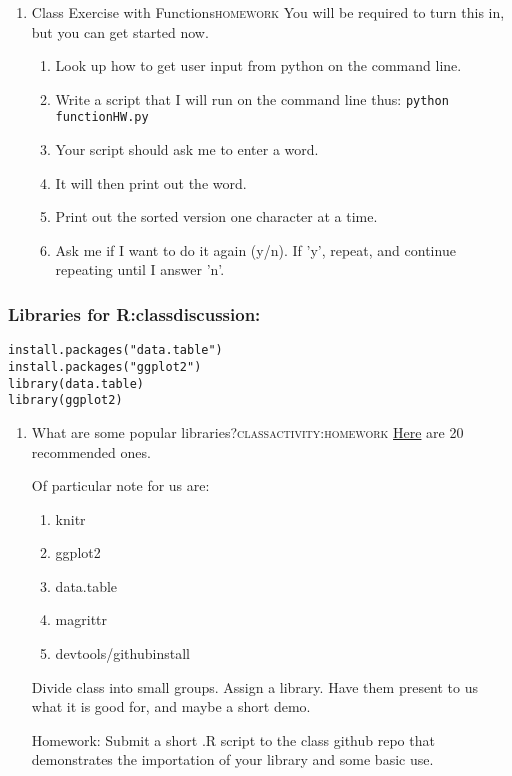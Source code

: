 \documentclass{article}
\begin{document}
\begin{enumerate}
\item Class Exercise with Functions\hfill{}\textsc{homework}
\label{sec:org81251bb}
You will be required to turn this in, but you can get started now. 
\begin{enumerate}
\item Look up how to get user input from python on the command line.
\item Write a script that I will run on the command line thus:
\texttt{python functionHW.py}
\item Your script should ask me to enter a word.
\item It will then print out the word.
\item Print out the sorted version one character at a time.
\item Ask me if I want to do it again (y/n). If 'y', repeat, and continue repeating until I answer 'n'.
\end{enumerate}
\end{enumerate}
\subsubsection{Libraries for R:classdiscussion:}
\label{sec:orga527ced}
\begin{verbatim}
install.packages("data.table")
install.packages("ggplot2")
library(data.table)
library(ggplot2)
\end{verbatim}
\begin{enumerate}
\item What are some popular libraries?\hfill{}\textsc{classactivity:homework}
\label{sec:org9ea0cbb}
\href{https://pythontips.com/2013/07/30/20-python-libraries-you-cant-live-without/}{Here} are 20 recommended ones.

Of particular note for us are:
\begin{enumerate}
\item knitr
\item ggplot2
\item data.table
\item magrittr
\item devtools/githubinstall
\end{enumerate}

Divide class into small groups. Assign a library. Have them present to us what it is good for, and maybe a short demo. 

Homework: Submit a short .R script to the class github repo that demonstrates the importation of your library and some basic use.
\end{enumerate}
\end{document}
